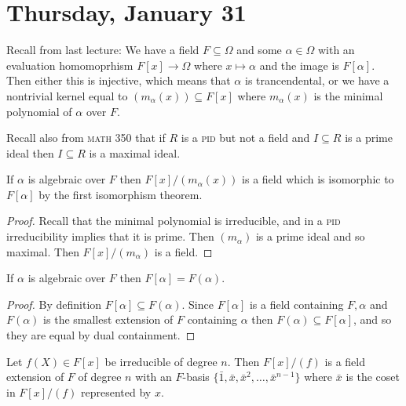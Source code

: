 
\section{Thursday, January 31}

Recall from last lecture: We have a field $F \subseteq \Omega$ and some $\alpha \in \Omega$ with an evaluation homomoprhism $F[x] \to \Omega$ where $x \mapsto \alpha$ and the image is $F[\alpha]$. Then either this is injective, which means that $\alpha$ is trancendental, or we have a nontrivial kernel equal to $(m_\alpha(x)) \subseteq F[x]$ where $m_\alpha(x)$ is the minimal polynomial of $\alpha$ over $F$.

Recall also from \textsc{math 350} that if $R$ is a \textsc{pid} but not a field and $I \subseteq R$ is a prime ideal then $I \subseteq R$ is a maximal ideal.

\begin{corollary}
If $\alpha$ is algebraic over $F$ then $F[x]/(m_\alpha(x))$ is a field which is isomorphic to $F[\alpha]$ by the first isomorphism theorem.
\end{corollary}

\begin{proof}
Recall that the minimal polynomial is irreducible, and in a \textsc{pid} irreducibility implies that it is prime. Then $(m_\alpha)$ is a prime ideal and so maximal. Then $F[x]/(m_\alpha)$ is a field.
\end{proof}

\begin{corollary}
If $\alpha$ is algebraic over $F$ then $F[\alpha] = F(\alpha)$.
\end{corollary}

\begin{proof}
By definition $F[\alpha] \subseteq F(\alpha)$. Since $F[\alpha]$ is a field containing $F,\alpha$ and $F(\alpha)$ is the smallest extension of $F$ containing $\alpha$ then $F(\alpha) \subseteq F[\alpha]$, and so they are equal by dual containment.
\end{proof}

\begin{theorem}
Let $f(X) \in F[x]$ be irreducible of degree $n$. Then $F[x]/(f)$ is a field extension of $F$ of degree $n$ with an $F$-basis $\{\bar{1}, \bar{x}, \bar{x}^2, \dotsc, \bar{x}^{n-1}\}$ where $\bar{x}$ is the coset in $F[x]/(f)$ represented by $x$.
\end{theorem}

